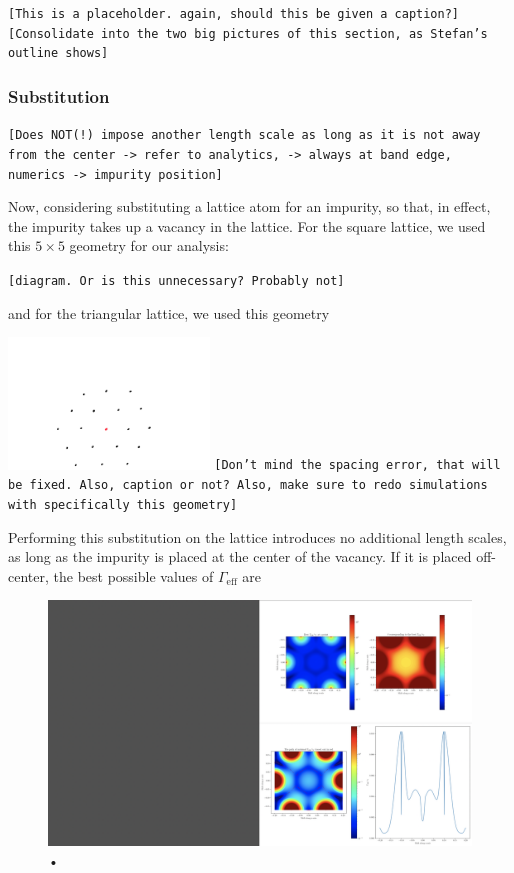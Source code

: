 \documentclass[aps,pra,superscriptaddress,twocolumn]{revtex4-1}
\newcommand{\commentSB}[1]{\texttt{\color{blue}[#1]}}
\newcommand{\commentSO}[1]{\texttt{\color{orange}[#1]}}
\newcommand{\commentTP}[1]{\texttt{\color{green}[#1]}}
\begin{document}
\commentSB{This is a placeholder. again, should this be given a caption?}
\commentTP{Consolidate into the two big pictures of this section, as Stefan's outline shows}


\subsubsection{Substitution}
\commentSO{Does NOT(!) impose another length scale as long as it is not away from the center -> refer to analytics, -> always at band edge, numerics -> impurity position}

Now, considering substituting a lattice atom for an impurity, so that, in effect, the impurity takes up a vacancy in the lattice. For the square lattice, we used this $5 \times 5$ geometry for our analysis:

\commentSB{diagram. Or is this unnecessary? Probably not}

and for the triangular lattice, we used this geometry

\includegraphics[width=0.4\textwidth]{figures/triangle_substitution_geometry.png}
\commentSB{Don't mind the spacing error, that will be fixed. Also, caption or not? Also, make sure to redo simulations with specifically this geometry}

Performing this substitution on the lattice introduces no additional length scales, as long as the impurity is placed at the center of the vacancy. If it is placed off-center, the best possible values of $\Gamma_\text{eff}$ are 


\begin{figure}
    \centering
    \includegraphics[width=1.0\textwidth]{figures/triangle_and_square_plaquette_substitution.png} 
    \caption{•}
    \label{fig:triangle_and_square_plaquette_substitution}
\end{figure}
\end{document}
